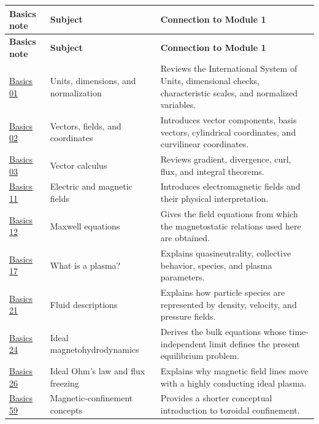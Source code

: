 \documentclass[11pt]{article}
\begin{document}
\begin{longtable}{>{\RaggedRight\arraybackslash}p{} >{\RaggedRight\arraybackslash}p{} >{\RaggedRight\arraybackslash}p{}}
\toprule
\textbf{Basics note} & \textbf{Subject} & \textbf{Connection to Module 1}\\
\midrule
\endfirsthead
\toprule
\textbf{Basics note} & \textbf{Subject} & \textbf{Connection to Module 1}\\
\midrule
\endhead
\href{run:basics/basics_01_units_dimensions_and_normalization.pdf}{Basics 01} & Units, dimensions, and normalization & Reviews the International System of Units, dimensional checks, characteristic scales, and normalized variables.\\
\href{run:basics/basics_02_vectors_fields_and_coordinate_systems.pdf}{Basics 02} & Vectors, fields, and coordinates & Introduces vector components, basis vectors, cylindrical coordinates, and curvilinear coordinates.\\
\href{run:basics/basics_03_vector_calculus_for_plasma_physics.pdf}{Basics 03} & Vector calculus & Reviews gradient, divergence, curl, flux, and integral theorems.\\
\href{run:basics/basics_11_electric_and_magnetic_fields.pdf}{Basics 11} & Electric and magnetic fields & Introduces electromagnetic fields and their physical interpretation.\\
\href{run:basics/basics_12_maxwell_equations.pdf}{Basics 12} & Maxwell equations & Gives the field equations from which the magnetostatic relations used here are obtained.\\
\href{run:basics/basics_17_what_is_a_plasma.pdf}{Basics 17} & What is a plasma? & Explains quasineutrality, collective behavior, species, and plasma parameters.\\
\href{run:basics/basics_21_single_fluid_and_multifluid_descriptions.pdf}{Basics 21} & Fluid descriptions & Explains how particle species are represented by density, velocity, and pressure fields.\\
\href{run:basics/basics_24_derivation_of_ideal_magnetohydrodynamics.pdf}{Basics 24} & Ideal magnetohydrodynamics & Derives the bulk equations whose time-independent limit defines the present equilibrium problem.\\
\href{run:basics/basics_26_ideal_ohms_law_and_flux_freezing.pdf}{Basics 26} & Ideal Ohm's law and flux freezing & Explains why magnetic field lines move with a highly conducting ideal plasma.\\
\href{run:basics/basics_59_magnetic_confinement_concepts.pdf}{Basics 59} & Magnetic-confinement concepts & Provides a shorter conceptual introduction to toroidal confinement.\\

\end{longtable}
\end{document}
